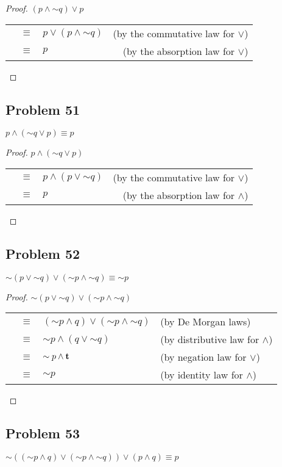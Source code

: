 \documentclass[14pt]{extarticle}
\newcommand{\true}{{\bf t}}
\begin{document}
\begin{proof}
$(p \wedge {\sim q}) \vee p$

\begin{tabular}{rclr}
& $\equiv$ & $p \vee (p \wedge {\sim q})$ & (by the commutative law for $\vee$)
\\
 & $\equiv$ & $p$ & (by the absorption law for $\vee$) \\
\end{tabular}
\end{proof}

\subsection{Problem 51}
$p \wedge ({\sim q} \vee p) \equiv p$

\begin{proof}
$p \wedge ({\sim q} \vee p)$

\begin{tabular}{rclr}
& $\equiv$ & $p \wedge (p \vee {\sim q})$ & (by the commutative law for $\vee$)
\\
 & $\equiv$ & $p$ & (by the absorption law for $\wedge$) \\
\end{tabular}
\end{proof}

\subsection{Problem 52}
${\sim (p \vee {\sim q})} \vee ({\sim p} \wedge {\sim q}) \equiv {\sim p}$

\begin{proof}
${\sim (p \vee {\sim q})} \vee ({\sim p} \wedge {\sim q})$ 

\begin{tabular}{rcll}
& $\equiv$ & $({\sim p} \wedge q) \vee ({\sim p} \wedge {\sim q})$ & (by De
Morgan laws) \\
& $\equiv$ & ${\sim p} \wedge (q \vee {\sim q})$ & (by distributive law for
$\wedge$) \\
 & $\equiv$ & ${\sim p} \wedge \true$ & (by negation law for $\vee$) \\
 & $\equiv$ & ${\sim p}$ & (by identity law for $\wedge$) \\
\end{tabular}
\end{proof}

\subsection{Problem 53}
$\sim(({\sim p} \wedge q) \vee ({\sim p} \wedge {\sim q})) \vee (p \wedge q)
\equiv p$
\end{document}
